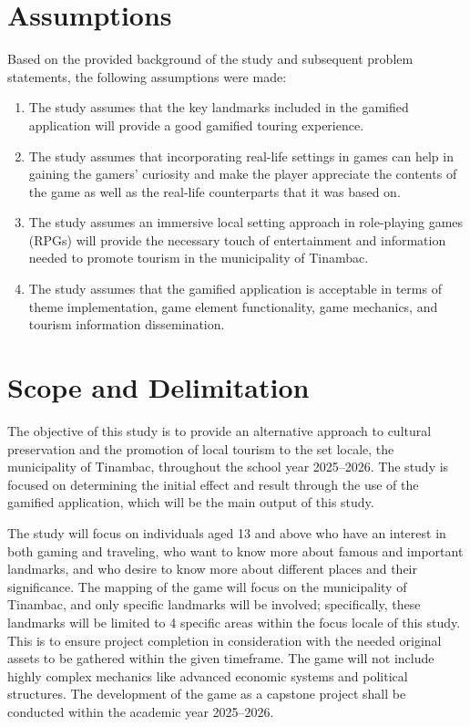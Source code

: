 \documentclass{research}
\begin{document}
\section{Assumptions}

Based on the provided background of the study and subsequent problem statements, the
following assumptions were made:

\begin{enumerate}
  \item The study assumes that the key landmarks included in the gamified application
        will provide a good gamified touring experience.
  \item The study assumes that incorporating real-life settings in games can help in
        gaining the gamers' curiosity and make the player appreciate the contents of
        the game as well as the real-life counterparts that it was based on.
  \item The study assumes an immersive local setting approach in role-playing games
        (RPGs) will provide the necessary touch of entertainment and information needed
        to promote tourism in the municipality of Tinambac.
  \item The study assumes that the gamified application is acceptable in terms of theme
        implementation, game element functionality, game mechanics, and tourism
        information dissemination.
\end{enumerate}

\section{Scope and Delimitation}

The objective of this study is to provide an alternative approach to cultural
preservation and the promotion of local tourism to the set locale, the municipality of
Tinambac, throughout the school year 2025--2026. The study is focused on determining
the initial effect and result through the use of the gamified application, which will
be the main output of this study.

The study will focus on individuals aged 13 and above who have an interest in both
gaming and traveling, who want to know more about famous and important landmarks, and
who desire to know more about different places and their significance. The mapping of
the game will focus on the municipality of Tinambac, and only specific landmarks will
be involved; specifically, these landmarks will be limited to 4 specific areas within
the focus locale of this study. This is to ensure project completion in consideration
with the needed original assets to be gathered within the given timeframe. The game
will not include highly complex mechanics like advanced economic systems and political
structures. The development of the game as a capstone project shall be conducted within
the academic year 2025--2026.
\end{document}
